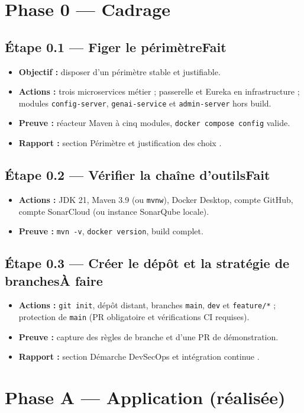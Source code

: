 \documentclass[12pt,a4paper]{article}
\newcommand{\code}[1]{\texttt{\small #1}}
\newcommand{\fait}{\hfill\textcolor{green!45!black}{\small\textbf{Fait}}}
\newcommand{\afaire}{\hfill\textcolor{orange!80!black}{\small\textbf{\`A faire}}}
\newcommand{\etape}[2]{%
  \subsection*{#1\ifstrequal{#2}{f}{\fait}{\afaire}}%
}
\begin{document}
\section{Phase 0 --- Cadrage}

\etape{\'Etape 0.1 --- Figer le p\'erim\`etre}{f}
\begin{itemize}[leftmargin=1.4em,itemsep=0.1em]
  \item \textbf{Objectif :} disposer d'un p\'erim\`etre stable et justifiable.
  \item \textbf{Actions :} trois microservices m\'etier ; passerelle et Eureka en infrastructure ;
        modules \code{config-server}, \code{genai-service} et \code{admin-server} hors build.
  \item \textbf{Preuve :} r\'eacteur Maven \`a cinq modules, \code{docker compose config} valide.
  \item \textbf{Rapport :} section \guillemotleft{} P\'erim\`etre et justification des choix \guillemotright{}.
\end{itemize}

\etape{\'Etape 0.2 --- V\'erifier la cha\^ine d'outils}{f}
\begin{itemize}[leftmargin=1.4em,itemsep=0.1em]
  \item \textbf{Actions :} JDK 21, Maven 3.9 (ou \code{mvnw}), Docker Desktop, compte GitHub,
        compte SonarCloud (ou instance SonarQube locale).
  \item \textbf{Preuve :} \code{mvn -v}, \code{docker version}, build complet.
\end{itemize}

\etape{\'Etape 0.3 --- Cr\'eer le d\'ep\^ot et la strat\'egie de branches}{a}
\begin{itemize}[leftmargin=1.4em,itemsep=0.1em]
  \item \textbf{Actions :} \code{git init}, d\'ep\^ot distant, branches \code{main},
        \code{dev} et \code{feature/*} ; protection de \code{main} (PR obligatoire et
        v\'erifications CI requises).
  \item \textbf{Preuve :} capture des r\`egles de branche et d'une PR de d\'emonstration.
  \item \textbf{Rapport :} section \guillemotleft{} D\'emarche DevSecOps et int\'egration continue \guillemotright{}.
\end{itemize}

\section{Phase A --- Application (r\'ealis\'ee)}
\end{document}

